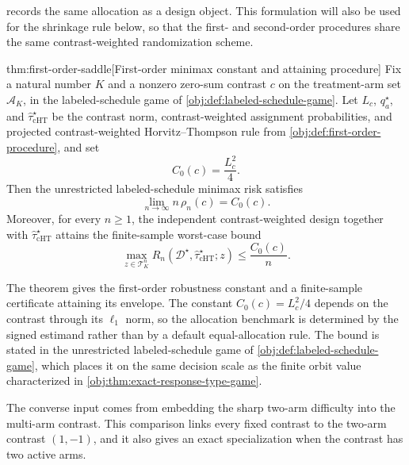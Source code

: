  records the same allocation as a design object. This formulation will also be used for the shrinkage rule below, so that the first- and second-order procedures share the same contrast-weighted randomization scheme.

\begin{theoremv}{thm:first-order-saddle}[First-order minimax constant and attaining procedure]
Fix a natural number \(K\) and a nonzero zero-sum contrast \(c\) on the treatment-arm set \(\mathcal A_K\), in the labeled-schedule game of \cref{obj:def:labeled-schedule-game}. Let \(L_c\), \(q_a^\star\), and \(\widehat\tau_{\mathrm{cHT}}^\star\) be the contrast norm, contrast-weighted assignment probabilities, and projected contrast-weighted Horvitz--Thompson rule from \cref{obj:def:first-order-procedure}, and set
\[
C_0(c)=\frac{L_c^2}{4}.
\]
Then the unrestricted labeled-schedule minimax risk satisfies
\[
\lim_{n\to\infty} n\,\rho_n(c)=C_0(c).
\]
Moreover, for every \(n\ge 1\), the independent contrast-weighted design together with \(\widehat\tau_{\mathrm{cHT}}^\star\) attains the finite-sample worst-case bound
\[
\max_{z\in\mathcal T_K^n}
R_n(\mathcal D^\star,\widehat\tau_{\mathrm{cHT}}^\star;z)
\le
\frac{C_0(c)}{n}.
\]
\end{theoremv}

The theorem gives the first-order robustness constant and a finite-sample certificate attaining its envelope. The constant \(C_0(c)=L_c^2/4\) depends on the contrast through its \(\ell_1\) norm, so the allocation benchmark is determined by the signed estimand rather than by a default equal-allocation rule. The bound is stated in the unrestricted labeled-schedule game of \cref{obj:def:labeled-schedule-game}, which places it on the same decision scale as the finite orbit value characterized in \cref{obj:thm:exact-response-type-game}.

The converse input comes from embedding the sharp two-arm difficulty into the multi-arm contrast. This comparison links every fixed contrast to the two-arm contrast \((1,-1)\), and it also gives an exact specialization when the contrast has two active arms.

